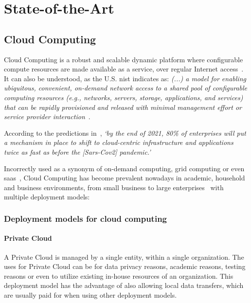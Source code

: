 \chapter{State-of-the-Art}\label{state-of-the-art}

\section{Cloud Computing}\label{state-of-the-art:s:cloud-computing}

Cloud Computing is a robust and scalable dynamic platform where configurable compute resources are made available as a service, over regular Internet access~\Parencite{alnumay_2020}.
It can also be understood, as the U.S. \gls{nist} indicates as:
\textit{(...) a model for enabling ubiquitous, convenient, on-demand network access to a shared pool of configurable computing resources (e.g., networks, servers, storage, applications, and services) that can be rapidly provisioned and released with minimal management effort or service provider interaction}~\Parencite{mell_grance_2011}. 

According to the predictions in~\Parencite{idc_2021}, \textit{`by the end of 2021, 80\% of enterprises will put a mechanism in place to shift to cloud-centric infrastructure and applications twice as fast as before the [Sars-Cov2] pandemic.'}

Incorrectly used as a synonym of on-demand computing, grid computing or even \gls{saas}~\Parencite{kim_2009}, Cloud Computing has become prevalent nowadays in academic, household and business environments, from small business to large enterprises~\Parencite{rezaei_chiew_lee_shams_aliee_2014} with multiple deployment models:

\subsection{Deployment models for cloud computing}\label{state-of-the-art:ss:deployment-models-for-cloud-computing}

\subsubsection{Private Cloud}\label{state-of-the-art:sss:private-cloud}
A Private Cloud is managed by a single entity, within a single organization. The uses for Private Cloud can be for data privacy reasons, academic reasons, testing reasons or even to utilize existing in-house resources of an organization. This deployment model has the advantage of also allowing local data transfers, which are usually paid for when using other deployment models.

